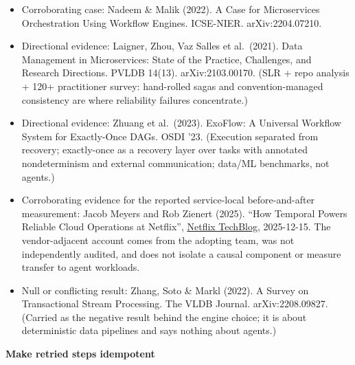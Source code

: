 \begin{itemize}
\tightlist
\item
  Corroborating case: Nadeem \& Malik (2022). A Case for Microservices Orchestration Using Workflow Engines. ICSE-NIER. arXiv:2204.07210.
\item
  Directional evidence: Laigner, Zhou, Vaz Salles et al.~(2021). Data Management in Microservices: State of the Practice, Challenges, and Research Directions. PVLDB 14(13). arXiv:2103.00170. (SLR + repo analysis + 120+ practitioner survey: hand-rolled sagas and convention-managed consistency are where reliability failures concentrate.)
\item
  Directional evidence: Zhuang et al.~(2023). ExoFlow: A Universal Workflow System for Exactly-Once DAGs. OSDI '23. (Execution separated from recovery; exactly-once as a recovery layer over tasks with annotated nondeterminism and external communication; data/ML benchmarks, not agents.)
\item
  Corroborating evidence for the reported service-local before-and-after measurement: Jacob Meyers and Rob Zienert (2025). ``How Temporal Powers Reliable Cloud Operations at Netflix'', \href{https://netflixtechblog.com/how-temporal-powers-reliable-cloud-operations-at-netflix-73c69ccb5953}{Netflix TechBlog}, 2025-12-15. The vendor-adjacent account comes from the adopting team, was not independently audited, and does not isolate a causal component or measure transfer to agent workloads.
\item
  Null or conflicting result: Zhang, Soto \& Markl (2022). A Survey on Transactional Stream Processing. The VLDB Journal. arXiv:2208.09827. (Carried as the negative result behind the engine choice; it is about deterministic data pipelines and says nothing about agents.)
\end{itemize}

\textbf{Make retried steps idempotent}

